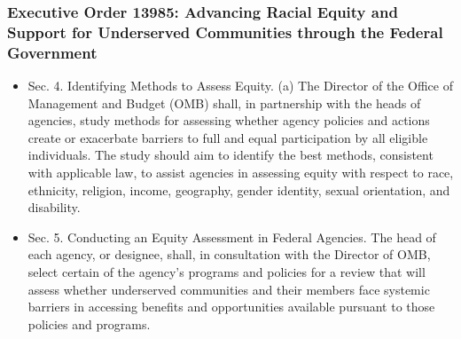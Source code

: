 \documentclass[handout]{beamer}
\begin{document}
\begin{frame}

  \frametitle{Executive Order 13985: {\small Advancing Racial Equity and Support for Underserved Communities through the Federal Government}}

  \begin{itemize}
  \item \alert{Sec. 4.  Identifying Methods to Assess Equity}.  (a)
    The Director of the Office of Management and Budget (OMB) shall,
    in partnership with the heads of agencies, study methods for
    assessing whether agency policies and actions create or exacerbate
    barriers to full and equal participation by all eligible
    individuals.  The study should aim to identify the best methods,
    consistent with applicable law, to assist agencies in assessing
    equity with respect to race, ethnicity, religion, income,
    geography, gender identity, sexual orientation, and disability.

    \vfill
  \item \alert{Sec. 5.  Conducting an Equity Assessment in Federal
      Agencies.}  The head of each agency, or designee, shall, in
    consultation with the Director of OMB, select certain of the
    agency's programs and policies for a review that will assess
    whether underserved communities and their members face systemic
    barriers in accessing benefits and opportunities available
    pursuant to those policies and programs.
  \end{itemize}

\end{frame}
\end{document}
